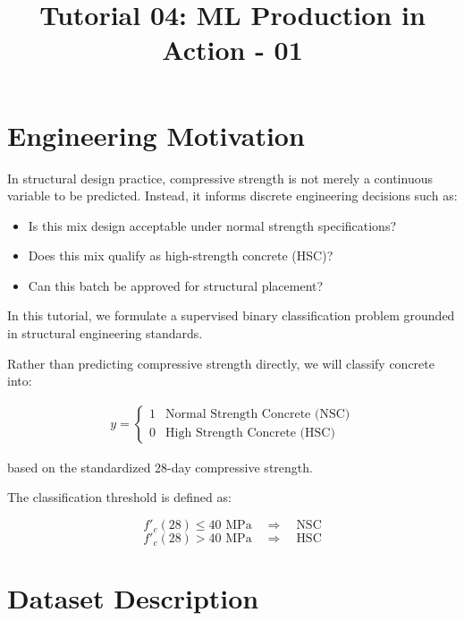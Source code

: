 \documentclass[12pt]{article}
\begin{document}
\title{Tutorial 04:  ML Production in Action - 01}
\author{}
\date{}

\maketitle

\section*{Engineering Motivation}

In structural design practice, compressive strength is not merely a continuous variable to be predicted. Instead, it informs discrete engineering decisions such as:

\begin{itemize}
    \item Is this mix design acceptable under normal strength specifications?
    \item Does this mix qualify as high-strength concrete (HSC)?
    \item Can this batch be approved for structural placement?
\end{itemize}

In this tutorial, we formulate a supervised binary classification problem grounded in structural engineering standards.

Rather than predicting compressive strength directly, we will classify concrete into:

\begin{align*}
y =
\begin{cases}
1 & \text{Normal Strength Concrete (NSC)} \\
0 & \text{High Strength Concrete (HSC)}
\end{cases}
\end{align*}

based on the standardized 28-day compressive strength.

\vspace{0.5em}

\noindent
The classification threshold is defined as:

\[
f'_c(28) \le 40 \text{ MPa} \quad \Rightarrow \quad \text{NSC}
\]
\[
f'_c(28) > 40 \text{ MPa} \quad \Rightarrow \quad \text{HSC}
\]

\section*{Dataset Description}
\end{document}
